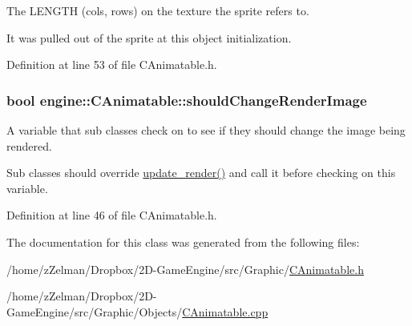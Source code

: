 The L\-E\-N\-G\-T\-H (cols, rows) on the texture the sprite refers to. 

It was pulled out of the sprite at this object initialization. 

Definition at line 53 of file C\-Animatable.\-h.

\hypertarget{classengine_1_1CAnimatable_a1733e847840f52f15958546d1eb21810}{
\subsubsection[{should\-Change\-Render\-Image}]{\setlength{\rightskip}{0pt plus 5cm}bool engine\-::\-C\-Animatable\-::should\-Change\-Render\-Image\hspace{0.3cm}{\ttfamily [protected]}}}\label{classengine_1_1CAnimatable_a1733e847840f52f15958546d1eb21810}


A variable that sub classes check on to see if they should change the image being rendered. 

Sub classes should override \hyperlink{classengine_1_1CAnimatable_a82b6fa8105fa03117e83a6131ab57a3c}{update\-\_\-render()} and call it before checking on this variable. 

Definition at line 46 of file C\-Animatable.\-h.



The documentation for this class was generated from the following files\-:\begin{DoxyCompactItemize}
\item 
/home/z\-Zelman/\-Dropbox/2\-D-\/\-Game\-Engine/src/\-Graphic/\hyperlink{CAnimatable_8h}{C\-Animatable.\-h}\item 
/home/z\-Zelman/\-Dropbox/2\-D-\/\-Game\-Engine/src/\-Graphic/\-Objects/\hyperlink{CAnimatable_8cpp}{C\-Animatable.\-cpp}\end{DoxyCompactItemize}
